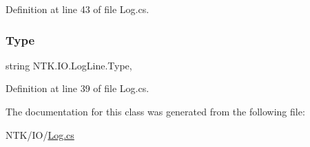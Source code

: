 Definition at line 43 of file Log.\+cs.

\mbox{\label{class_n_t_k_1_1_i_o_1_1_log_line_a6c75f9c036369d2a6a9a62653ff20df5}} 
\subsubsection{\texorpdfstring{Type}{Type}}
{\footnotesize\ttfamily string N\+T\+K.\+I\+O.\+Log\+Line.\+Type\hspace{0.3cm}{\ttfamily [get]}, {\ttfamily [set]}}







Definition at line 39 of file Log.\+cs.



The documentation for this class was generated from the following file\+:\begin{DoxyCompactItemize}
\item 
N\+T\+K/\+I\+O/\mbox{\hyperlink{_log_8cs}{Log.\+cs}}\end{DoxyCompactItemize}
